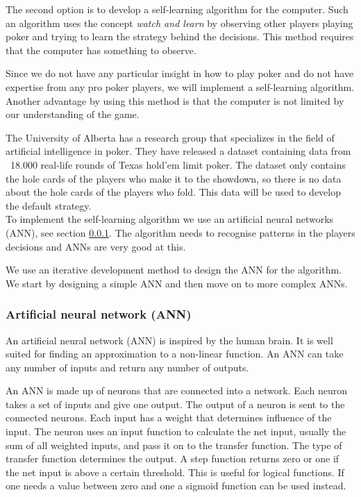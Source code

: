 The second option is to develop a self-learning algorithm for the computer. Such an algorithm uses the concept \textit{watch and learn} by observing other players playing poker and trying to learn the strategy behind the decisions. This method requires that the computer has something to observe.

Since we do not have any particular insight in how to play poker and do not have expertise from any pro poker players, we will implement a self-learning algorithm. Another advantage by using this method is that the computer is not limited by our understanding of the game.

The University of Alberta has a research group that specializes in the field of artificial intelligence in poker. They have released a dataset containing data from ~18.000 real-life rounds of Texas hold'em limit poker. The dataset only contains the hole cards of the players who make it to the showdown, so there is no data about the hole cards of the players who fold. This data will be used to develop the default strategy.\\

To implement the self-learning algorithm we use an artificial neural networks (ANN), see section \ref{sec:nn}. The algorithm needs to recognise patterns in the players decisions and ANNs are very good at this.

We use an iterative development method to design the ANN for the algorithm. We start by designing a simple ANN and then move on to more complex ANNs.

\subsubsection{Artificial neural network (ANN)}
\label{sec:nn}
An artificial neural network (ANN) is inspired by the human brain. It is well suited for finding an approximation to a non-linear function. An ANN can take any number of inputs and return any number of outputs. 

An ANN is made up of neurons that are connected into a network. Each neuron takes a set of inputs and give one output. The output of a neuron is sent to the connected neurons. Each input has a weight that determines influence of the input. The neuron uses an input function to calculate the net input, usually the sum of all weighted inputs, and pass it on to the transfer function. The type of transfer function determines the output. A step function returns zero or one if the net input is above a certain threshold. This is useful for logical functions. If one needs a value between zero and one a sigmoid function can be used instead.

